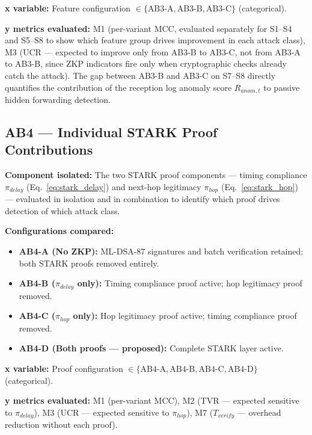 \documentclass[12pt, a4paper]{report}
\begin{document}
{{\textbf{x variable:} Feature configuration
$\in \{\text{AB3-A}, \text{AB3-B},
\text{AB3-C}\}$ (categorical).

\textbf{y metrics evaluated:} M1 (per-variant
\ac{MCC}, evaluated separately for S1--S4
and S5--S8 to show which feature group drives
improvement in each attack class), M3 (UCR ---
expected to improve only from AB3-B to AB3-C,
not from AB3-A to AB3-B, since \ac{ZKP}
indicators fire only when cryptographic checks
already catch the attack). The gap between AB3-B
and AB3-C on S7--S8 directly quantifies the
contribution of the reception log anomaly score
$R_{anom,t}$ to passive hidden forwarding
detection.



\subsection{AB4 — Individual STARK Proof Contributions}
\label{sec:ab4}

\textbf{Component isolated:}
The two \ac{STARK} proof components — timing compliance
$\pi_{delay}$ (Eq.~\ref{eq:stark_delay}) and next-hop
legitimacy $\pi_{hop}$ (Eq.~\ref{eq:stark_hop}) —
evaluated in isolation and in combination to identify
which proof drives detection of which attack class.

\textbf{Configurations compared:}
\begin{itemize}
    \item \textbf{AB4-A (No ZKP):} ML-DSA-87 signatures
    and batch verification retained; both \ac{STARK}
    proofs removed entirely.
    \item \textbf{AB4-B ($\pi_{delay}$ only):}
    Timing compliance proof active; hop legitimacy
    proof removed.
    \item \textbf{AB4-C ($\pi_{hop}$ only):}
    Hop legitimacy proof active; timing compliance
    proof removed.
    \item \textbf{AB4-D (Both proofs — proposed):}
    Complete \ac{STARK} layer active.
\end{itemize}

\textbf{x variable:} Proof configuration
$\in \{\text{AB4-A}, \text{AB4-B},
\text{AB4-C}, \text{AB4-D}\}$ (categorical).

\textbf{y metrics evaluated:} M1 (per-variant MCC),
M2 (TVR — expected sensitive to $\pi_{delay}$),
M3 (UCR — expected sensitive to $\pi_{hop}$),
M7 ($T_{verify}$ — overhead reduction without each proof).


}}
\end{document}
